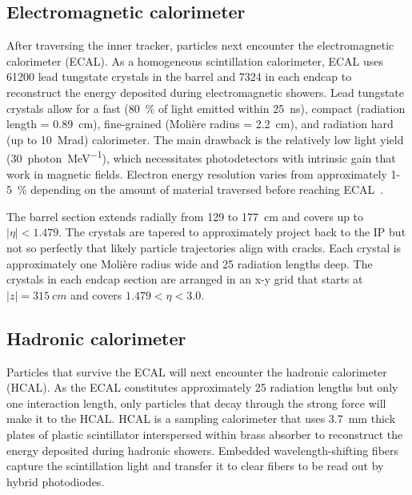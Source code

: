 



\subsection{Electromagnetic calorimeter}
After traversing the inner tracker, particles next encounter the electromagnetic calorimeter (ECAL). As a homogeneous scintillation calorimeter, ECAL uses \num{61200} lead tungstate crystals in the barrel and \num{7324} in each endcap to reconstruct the energy deposited during electromagnetic showers. Lead tungstate crystals allow for a fast (\SI{80}{\percent} of light emitted within \SI{25}{\ns}), compact (radiation length = \SI{0.89}{cm}), fine-grained (Moli\`ere radius = \SI{2.2}{\cm}), and radiation hard (up to \SI{10}{\mega rad}) calorimeter. The main drawback is the relatively low light yield (\SI{30}{photon\per\mega\electronvolt}), which necessitates photodetectors with intrinsic gain that work in magnetic fields\cite{cms_experiment, cms_tdr_v1}. Electron energy resolution varies from approximately \num{1}-\SI{5}{\percent} depending on the amount of material traversed before reaching ECAL~\cite{cms_ecal_performance}.

The barrel section extends radially from \num{129} to \SI{177}{cm} and covers up to $|\eta|<1.479$. The crystals are tapered to approximately project back to the IP but not so perfectly that likely particle trajectories align with cracks. Each crystal is approximately one Moli\`ere radius wide and 25 radiation lengths deep. The crystals in each endcap section are arranged in an x-y grid that starts at $\lvert z \rvert = \SI{315}{cm}$ and covers $1.479<\eta<3.0$.

\subsection{Hadronic calorimeter}
Particles that survive the ECAL will next encounter the hadronic calorimeter (HCAL). As the ECAL constitutes approximately 25 radiation lengths but only one interaction length, only particles that decay through the strong force will make it to the HCAL. HCAL is a sampling calorimeter that uses \SI{3.7}{\milli\metre} thick plates of plastic scintillator interspersed within brass absorber to reconstruct the energy deposited during hadronic showers. Embedded wavelength-shifting fibers capture the scintillation light and transfer it to clear fibers to be read out by hybrid photodiodes.

